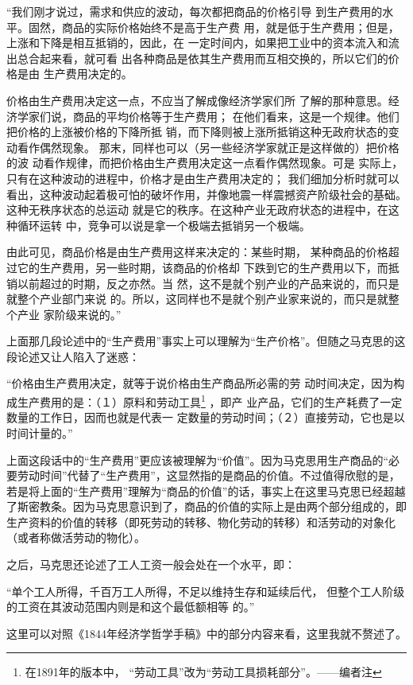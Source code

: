 \documentclass[a4paper,twoside,12pt,AutoFakeBold]{ctexart}
\begin{document}
\begin{adjustwidth}{2em}{2em}
    \qquad\fangsong
    “我们刚才说过，需求和供应的波动，每次都把商品的价格引导
到生产费用的水平。固然，商品的实际价格始终不是高于生产费
用，就是低于生产费用；但是，上涨和下降是相互抵销的，因此，在
一定时间内，如果把工业中的资本流入和流出总合起来看，就可看
出各种商品是依其生产费用而互相交换的，所以它们的价格是由
生产费用决定的。

价格由生产费用决定这一点，不应当了解成像经济学家们所
了解的那种意思。经济学家们说，商品的平均价格等于生产费用；
在他们看来，这是一个规律。他们把价格的上涨被价格的下降所抵
销，而下降则被上涨所抵销这种无政府状态的变动看作偶然现象。
那末，同样也可以（另一些经济学家就正是这样做的）把价格的波
动看作规律，而把价格由生产费用决定这一点看作偶然现象。可是
实际上，只有在这种波动的进程中，价格才是由生产费用决定的；
我们细加分析时就可以看出，这种波动起着极可怕的破坏作用，并像地震一样震撼资产阶级社会的基础。这种无秩序状态的总运动
就是它的秩序。在这种产业无政府状态的进程中，在这种循环运转
中，竞争可以说是拿一个极端去抵销另一个极端。

由此可见，商品价格是由生产费用这样来决定的：某些时期，
某种商品的价格超过它的生产费用，另一些时期，该商品的价格却
下跌到它的生产费用以下，而抵销以前超过的时期，反之亦然。当
然，这不是就个别产业的产品来说的，而只是就整个产业部门来说
的。所以，这同样也不是就个别产业家来说的，而只是就整个产业
家阶级来说的。”
\end{adjustwidth}
上面那几段论述中的“生产费用”事实上可以理解为“生产价格”。但随之马克思的这段论述又让人陷入了迷惑：
\begin{adjustwidth}{2em}{2em}
    \qquad\fangsong
    “价格由生产费用决定，就等于说价格由生产商品所必需的劳
动时间决定，因为构成生产费用的是：（１）原料和劳动工具\footnote{在1891年的版本中， “劳动工具”改为“劳动工具损耗部分”。——编者注} ，即产
业产品，它们的生产耗费了一定数量的工作日，因而也就是代表一
定数量的劳动时间；（２）直接劳动，它也是以时间计量的。”
\end{adjustwidth}
上面这段话中的“生产费用”更应该被理解为“价值”。因为马克思用生产商品的“必要劳动时间”代替了“生产费用”，这显然指的是商品的价值。不过值得欣慰的是，若是将上面的“生产费用”理解为“商品的价值”的话，事实上在这里马克思已经超越了斯密教条。因为马克思意识到了，商品的价值的实际上是由两个部分组成的，即生产资料的价值的转移（即死劳动的转移、物化劳动的转移）和活劳动的对象化（或者称做活劳动的物化）。

之后，马克思还论述了工人工资一般会处在一个水平，即：
\begin{adjustwidth}{2em}{2em}
\qquad\fangsong
“单个工人所得，千百万工人所得，不足以维持生存和延续后代，
但整个工人阶级的工资在其波动范围内则是和这个最低额相等
的。”
\end{adjustwidth}
这里可以对照《1844年经济学哲学手稿》中的部分内容来看，这里我就不赘述了。
\end{document}
